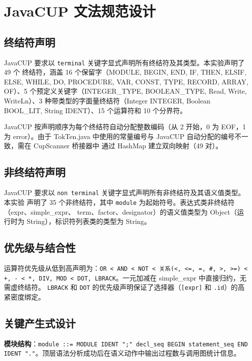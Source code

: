 \documentclass[a4paper]{article}
\begin{document}
\section{JavaCUP 文法规范设计}

\subsection{终结符声明}

JavaCUP 要求以 \texttt{terminal} 关键字显式声明所有终结符及其类型。本实验声明了 49 个
终结符，涵盖 16 个保留字（MODULE, BEGIN, END, IF, THEN, ELSIF, ELSE, WHILE, DO,
PROCEDURE, VAR, CONST, TYPE, RECORD, ARRAY, OF）、5 个预定义关键字（INTEGER\_TYPE,
BOOLEAN\_TYPE, Read, Write, WriteLn）、3 种带类型的字面量终结符（Integer INTEGER,
Boolean BOOL\_LIT, String IDENT）、15 个运算符和 10 个分界符。

JavaCUP 按声明顺序为每个终结符自动分配整数编码（从 2 开始，0 为 EOF，1 为 error）。由于
TokTen.java 中使用的常量编号与 JavaCUP 自动分配的编号不一致，需在 CupScanner 桥接器中
通过 HashMap 建立双向映射（49 对）。

\subsection{非终结符声明}

JavaCUP 要求以 \texttt{non terminal} 关键字显式声明所有非终结符及其语义值类型。本实验
声明了 35 个非终结符，其中 \texttt{module} 为起始符号。表达式类非终结符（expr、simple\_expr、
term、factor、designator）的语义值类型为 Object（运行时为 String），标识符列表类的类型为
String。

\subsection{优先级与结合性}

运算符优先级从低到高声明为：\texttt{OR < AND < NOT < 关系(<, <=, =, \#, >, >=)
< +, - < *, DIV, MOD < DOT, LBRACK}。一元加减在 simple\_expr 中直接归约，无需虚终结符。
\texttt{LBRACK} 和 \texttt{DOT} 的优先级声明保证了选择器（\texttt{[expr]} 和
\texttt{.id}）的高紧密度绑定。

\subsection{关键产生式设计}

\textbf{模块结构}：\texttt{module ::= MODULE IDENT ";" decl\_seq BEGIN statement\_seq
END IDENT "."}。顶层语法分析成功后在语义动作中输出过程数与调用图统计信息。
\end{document}
